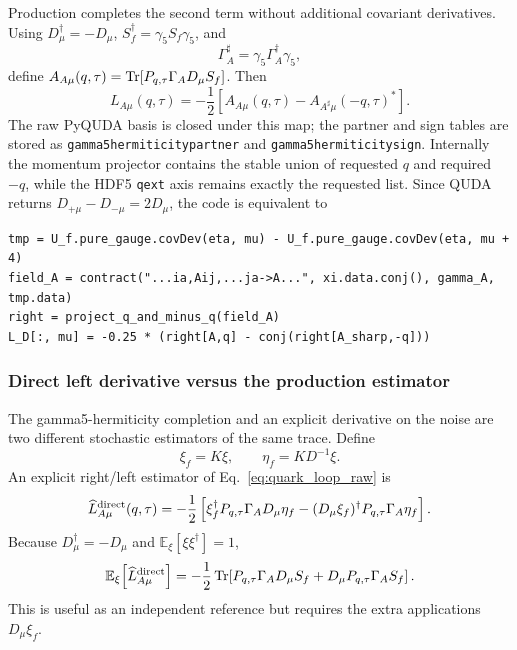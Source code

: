 \documentclass[11pt,a4paper]{article}
\newcommand{\code}[1]{\texttt{\begingroup\def\_{\textunderscore\allowbreak}#1\endgroup}}
\begin{document}
Production completes the second term without additional covariant derivatives.
Using \(D_\mu^\dagger=-D_\mu\), \(S_f^\dagger=\gamma_5S_f\gamma_5\), and
\begin{equation}
 \Gamma_A^\sharp=\gamma_5\Gamma_A^\dagger\gamma_5,
\end{equation}
define \(A_{A\mu}(q,\tau)=\Tr[P_{q,\tau}\Gamma_A D_\mu S_f]\).  Then
\begin{equation}
 L_{A\mu}(q,\tau)=-\frac12\left[
 A_{A\mu}(q,\tau)-A_{A^\sharp\mu}(-q,\tau)^*\right].
 \label{eq:gamma5_completed_loop}
\end{equation}
The raw PyQUDA basis is closed under this map; the partner and sign tables are
stored as \code{gamma5\_hermiticity\_partner} and
\code{gamma5\_hermiticity\_sign}.  Internally the momentum projector contains
the stable union of requested \(q\) and required \(-q\), while the HDF5
\code{qext} axis remains exactly the requested list.  Since QUDA returns
\(D_{+\mu}-D_{-\mu}=2D_\mu\), the code is equivalent to
\begin{verbatim}
tmp = U_f.pure_gauge.covDev(eta, mu) - U_f.pure_gauge.covDev(eta, mu + 4)
field_A = contract("...ia,Aij,...ja->A...", xi.data.conj(), gamma_A, tmp.data)
right = project_q_and_minus_q(field_A)
L_D[:, mu] = -0.25 * (right[A,q] - conj(right[A_sharp,-q]))
\end{verbatim}

\subsubsection{Direct left derivative versus the production estimator}

The gamma5-hermiticity completion and an explicit derivative on the noise are
two different stochastic estimators of the same trace.  Define
\begin{equation}
 \xi_f=K\xi,\qquad \eta_f=KD^{-1}\xi.
\end{equation}
An explicit right/left estimator of Eq.~\eqref{eq:quark_loop_raw} is
\begin{equation}
 \widehat L^{\rm direct}_{A\mu}(q,\tau)
 =-\frac12\left[
 \xi_f^\dagger P_{q,\tau}\Gamma_A D_\mu\eta_f
 -(D_\mu\xi_f)^\dagger P_{q,\tau}\Gamma_A\eta_f
 \right].
 \label{eq:direct_noise_derivative_estimator}
\end{equation}
Because \(D_\mu^\dagger=-D_\mu\) and
\(\mathbb E_\xi[\xi\xi^\dagger]=1\),
\begin{equation}
 \mathbb E_\xi\!\left[\widehat L^{\rm direct}_{A\mu}\right]
 =-\frac12\Tr\!\left[
 P_{q,\tau}\Gamma_A D_\mu S_f
 +D_\mu P_{q,\tau}\Gamma_A S_f\right].
\end{equation}
This is useful as an independent reference but requires the extra
applications \(D_\mu\xi_f\).
\end{document}
